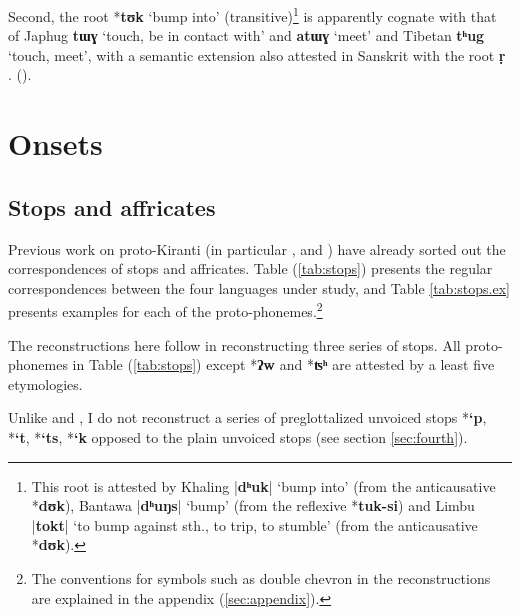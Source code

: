 \documentclass[oldfontcommands,oneside,a4paper,11pt]{article}
\newcommand{\ipa}[1]{\textbf{{\phon\mbox{#1}}}} %
\newcommand{\dhatu}[2]{|\ipa{#1}| `#2'}
\begin{document}
Second,  the root *\ipa{tʊk} `bump into' (transitive)\footnote{This root is attested by Khaling \dhatu{dʰuk}{bump into} (from the anticausative  *\ipa{dʊk}), Bantawa  \dhatu{dʰuŋs}{bump} (from the reflexive *\ipa{tuk-si}) and Limbu \dhatu{tokt}{to bump against sth., to trip, to stumble}  (from the anticausative  *\ipa{dʊk}).} is apparently cognate with that of Japhug \ipa{tɯɣ} `touch, be in contact with' and \ipa{atɯɣ} `meet' and Tibetan \ipa{tʰug} `touch, meet', with a semantic extension also attested in Sanskrit with the root \ipa{ṛ} .
(\citealt[3]{pooth15eri}).

\section{Onsets} \label{sec:onsets}

\subsection{Stops and affricates} \label{sec:stops}

Previous work on proto-Kiranti (in particular \citealt{starostin94kiranti}, \citealt{michailovsky94stops} and \citealt{opgenort05jero}) have already sorted out the correspondences of stops and affricates. Table (\ref{tab:stops}) presents the regular correspondences between the four languages under study, and Table \ref{tab:stops.ex} presents examples for each of the proto-phonemes.\footnote{The conventions for symbols such as double chevron in the reconstructions are explained in the appendix (\ref{sec:appendix}).}


The reconstructions here follow \citet{michailovsky94stops} in reconstructing three series of stops.  All proto-phonemes in Table (\ref{tab:stops}) except *\ipa{ʔw} and *\ipa{ʦʰ} are attested by a least five etymologies.

Unlike \citet{starostin94kiranti} and \citet{opgenort05jero}, I do not reconstruct a series of preglottalized unvoiced stops *\ipa{`p},  *\ipa{`t},  *\ipa{`ts},  *\ipa{`k} opposed to the plain unvoiced stops (see section \ref{sec:fourth}). 
\end{document}
